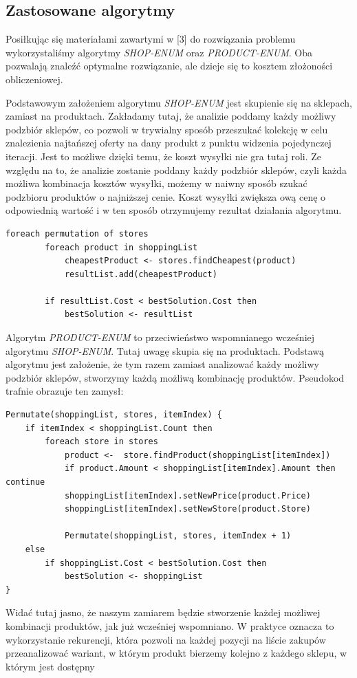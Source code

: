 \documentclass[a4paper]{article}
\begin{document}
\subsection{Zastosowane algorytmy}
Posiłkując się materiałami zawartymi w [3] do rozwiązania problemu wykorzystaliśmy algorytmy \textit{SHOP-ENUM} oraz \textit{PRODUCT-ENUM}. Oba pozwalają znaleźć optymalne rozwiązanie, ale dzieje się to kosztem złożoności obliczeniowej.

Podstawowym założeniem algorytmu \textit{SHOP-ENUM} jest skupienie się na sklepach, zamiast na produktach. Zakładamy tutaj, że analizie poddamy każdy możliwy podzbiór sklepów, co pozwoli w trywialny sposób przeszukać kolekcję w celu znalezienia najtańszej oferty na dany produkt z punktu widzenia pojedynczej iteracji. Jest to możliwe dzięki temu, że koszt wysyłki nie gra tutaj roli. Ze względu na to, że analizie zostanie poddany każdy podzbiór sklepów, czyli każda możliwa kombinacja kosztów wysyłki, możemy w naiwny sposób szukać podzbioru produktów o najniższej cenie. Koszt wysyłki zwiększa ową cenę o odpowiednią wartość i w ten sposób otrzymujemy rezultat działania algorytmu.
\vspace{0.5 cm}
\lstset{style=sharpc}
\begin{lstlisting}
foreach permutation of stores
		foreach product in shoppingList
			cheapestProduct <- stores.findCheapest(product)
			resultList.add(cheapestProduct)
		
		if resultList.Cost < bestSolution.Cost then
			bestSolution <- resultList
\end{lstlisting}
\vspace{0.5 cm}

Algorytm \textit{PRODUCT-ENUM} to przeciwieństwo wspomnianego wcześniej algorytmu \textit{SHOP-ENUM}. Tutaj uwagę skupia się na produktach. Podstawą algorytmu jest założenie, że tym razem zamiast analizować każdy możliwy podzbiór sklepów, stworzymy każdą możliwą kombinację produktów. Pseudokod trafnie obrazuje ten zamysł:

\vspace{0.5 cm}
\lstset{style=sharpc}
\begin{lstlisting}
Permutate(shoppingList, stores, itemIndex) {
	if itemIndex < shoppingList.Count then
		foreach store in stores 
			product <-  store.findProduct(shoppingList[itemIndex])
			if product.Amount < shoppingList[itemIndex].Amount then continue
			shoppingList[itemIndex].setNewPrice(product.Price)
			shoppingList[itemIndex].setNewStore(product.Store)
		
			Permutate(shoppingList, stores, itemIndex + 1)
	else
		if shoppingList.Cost < bestSolution.Cost then
			bestSolution <- shoppingList
}
\end{lstlisting}
\vspace{0.5 cm}
Widać tutaj jasno, że naszym zamiarem będzie stworzenie każdej możliwej kombinacji produktów, jak już wcześniej wspomniano. W praktyce oznacza to wykorzystanie rekurencji, która pozwoli na każdej pozycji na liście zakupów przeanalizować wariant, w którym produkt bierzemy kolejno z każdego sklepu, w którym jest dostępny
\end{document}
